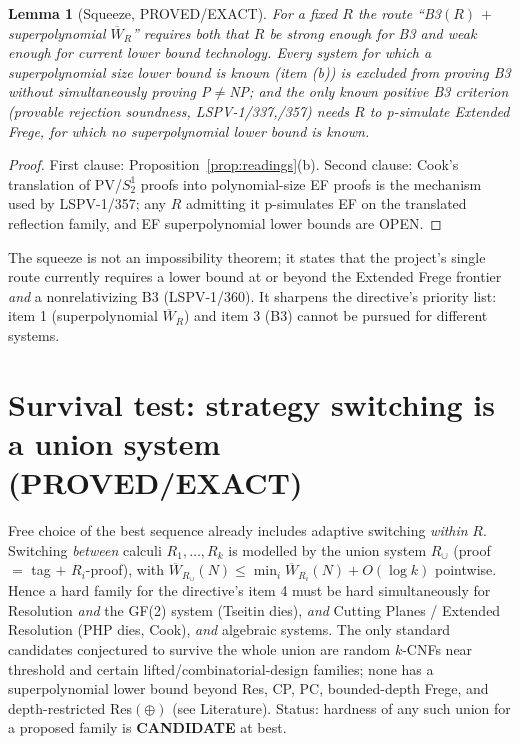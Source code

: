 \documentclass[11pt]{article}
\newtheorem{lemma}{Lemma}
\newcommand{\W}{\overline W}
\begin{document}
\begin{lemma}[Squeeze, PROVED/EXACT]\label{lem:squeeze}
For a fixed $R$ the route ``B3$(R)$ $+$ superpolynomial $\W_R$'' requires
\emph{both} that $R$ be strong enough for B3 and weak enough for current lower
bound technology. Every system for which a superpolynomial size lower bound is
known (item (b)) is excluded from proving B3 without simultaneously proving
P$\neq$NP; and the only known positive B3 criterion (provable rejection
soundness, LSPV-1/337,/357) needs $R$ to p-simulate Extended Frege, for which
no superpolynomial lower bound is known.
\end{lemma}
\begin{proof}
First clause: Proposition~\ref{prop:readings}(b). Second clause: Cook's
translation of $\mathrm{PV}$/$S^1_2$ proofs into polynomial-size EF proofs is the
mechanism used by LSPV-1/357; any $R$ admitting it p-simulates EF on the
translated reflection family, and EF superpolynomial lower bounds are OPEN.
\end{proof}
\noindent The squeeze is not an impossibility theorem; it states that
the project's single route currently requires a lower bound at or beyond the
Extended Frege frontier \emph{and} a nonrelativizing B3 (LSPV-1/360).
It sharpens the directive's priority list: item 1 (superpolynomial
$\W_R$) and item 3 (B3) cannot be pursued for different systems.

\section{Survival test: strategy switching is a union system (PROVED/EXACT)}
Free choice of the best sequence already includes adaptive switching
\emph{within} $R$. Switching \emph{between} calculi $R_1,\dots,R_k$ is
modelled by the union system $R_\cup$ (proof $=$ tag $+$ $R_i$-proof), with
$\W_{R_\cup}(N)\le\min_i\W_{R_i}(N)+O(\log k)$ pointwise. Hence a hard family
for the directive's item 4 must be hard simultaneously for Resolution
\emph{and} the GF(2) system (Tseitin dies), \emph{and} Cutting Planes /
Extended Resolution (PHP dies, Cook), \emph{and} algebraic systems. The only
standard candidates conjectured to survive the whole union are random
$k$-CNFs near threshold and certain lifted/combinatorial-design families;
none has a superpolynomial lower bound beyond Res, CP, PC, bounded-depth
Frege, and depth-restricted Res$(\oplus)$ (see Literature).
Status: hardness of any such union for a proposed family is \textbf{CANDIDATE}
at best.
\end{document}
